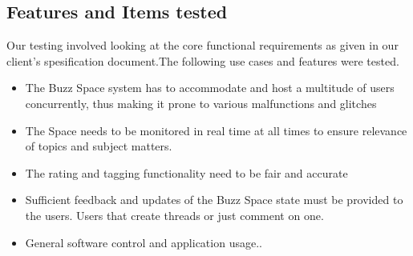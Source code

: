 \subsection{Features and Items tested}

Our testing involved looking at the core functional requirements as given in our client's spesification document.The following use cases and features were tested.



	
				
					\begin{itemize}
							\item The Buzz Space system has to accommodate and host a multitude of users concurrently, thus making it prone to various malfunctions and glitches
							
							\item The Space needs to be monitored in real time at all times to ensure relevance of topics and subject matters.
							\item The rating and tagging functionality need to be fair and accurate
							
							\item Sufficient feedback and updates of the Buzz Space state must be provided to the users. Users that create threads or just comment on one.
							
							\item General software control and application usage..
						 \end{itemize}